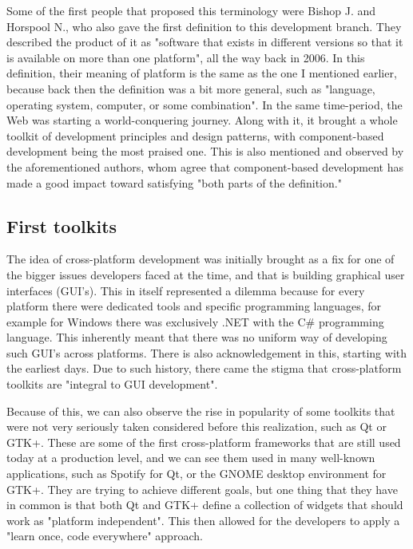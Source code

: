 \par
Some of the first people that proposed this terminology were Bishop J.
and Horspool N., who also gave the first definition to this development branch.
They described the product of it as "software that exists in different versions so that it is available on more than one platform"\cite{firstDefinition}, all the way back in 2006.
In this definition, their meaning of platform is the same as the one I mentioned earlier, because back then the definition was a bit more general, such as "language, operating system, computer, or some combination".
In the same time-period, the Web was starting a world-conquering journey.
Along with it, it brought a whole toolkit of development principles and design patterns, with component-based development being the most praised one.
This is also mentioned and observed by the aforementioned authors, whom agree that component-based development  has made a good impact  toward satisfying "both parts of the definition."\cite{firstDefinition}
\subsection{First toolkits}
The idea of cross-platform development was initially brought as a fix for one of the bigger issues developers faced at the time, and that is building graphical user interfaces (GUI's).
This in itself represented a dilemma because for every platform there were dedicated tools and specific programming languages, for example for Windows there was exclusively .NET with the C\# programming language.
This inherently meant that there was no uniform way of developing such GUI's across platforms.
There is also acknowledgement in this, starting with the earliest days.
Due to such history, there came the stigma that cross-platform toolkits are "integral to GUI development"\cite{firstDefinition}.

\par
Because of this, we can also observe the rise in popularity of some toolkits that were not very seriously taken considered before this realization, such as Qt or GTK+.
These are some of the first cross-platform frameworks that are still used today at a production level, and we can see them used in many well-known applications, such as Spotify for Qt, or the GNOME desktop environment for GTK+.
They are trying to achieve different goals, but one thing that they have in common is that both Qt and GTK+ define a collection of widgets that should work as "platform independent"\cite{firstDefinition}.
This then allowed for the developers to apply a "learn once, code everywhere" approach.
